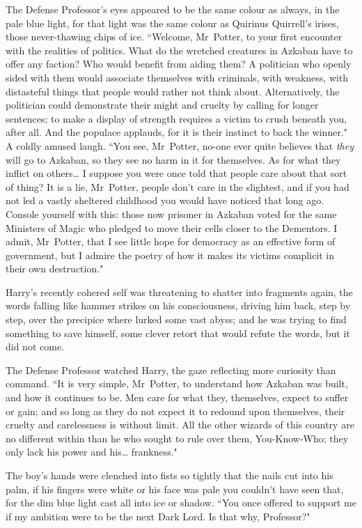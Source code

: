 The Defense Professor's eyes appeared to be the same colour as always, in the pale blue light, for that light was the same colour as Quirinus Quirrell's irises, those never-thawing chips of ice. ``Welcome, Mr~Potter, to your first encounter with the realities of politics. What do the wretched creatures in Azkaban have to offer any faction? Who would benefit from aiding them? A politician who openly sided with them would associate themselves with criminals, with weakness, with distasteful things that people would rather not think about. Alternatively, the politician could demonstrate their might and cruelty by calling for longer sentences; to make a display of strength requires a victim to crush beneath you, after all. And the populace applauds, for it is their instinct to back the winner." A coldly amused laugh. ``You see, Mr~Potter, no-one ever quite believes that \emph{they} will go to Azkaban, so they see no harm in it for themselves. As for what they inflict on others{\ldots} I suppose you were once told that people care about that sort of thing? It is a lie, Mr~Potter, people don't care in the slightest, and if you had not led a vastly sheltered childhood you would have noticed that long ago. Console yourself with this: those now prisoner in Azkaban voted for the same Ministers of Magic who pledged to move their cells closer to the Dementors. I admit, Mr~Potter, that I see little hope for democracy as an effective form of government, but I admire the poetry of how it makes its victims complicit in their own destruction."

Harry's recently cohered self was threatening to shatter into fragments again, the words falling like hammer strikes on his consciousness, driving him back, step by step, over the precipice where lurked some vast abyss; and he was trying to find something to save himself, some clever retort that would refute the words, but it did not come.

The Defense Professor watched Harry, the gaze reflecting more curiosity than command. ``It is very simple, Mr~Potter, to understand how Azkaban was built, and how it continues to be. Men care for what they, themselves, expect to suffer or gain; and so long as they do not expect it to redound upon themselves, their cruelty and carelessness is without limit. All the other wizards of this country are no different within than he who sought to rule over them, You-Know-Who; they only lack his power and his{\ldots} frankness."

The boy's hands were clenched into fists so tightly that the nails cut into his palm, if his fingers were white or his face was pale you couldn't have seen that, for the dim blue light cast all into ice or shadow. ``You once offered to support me if my ambition were to be the next Dark Lord. Is that why, Professor?"

